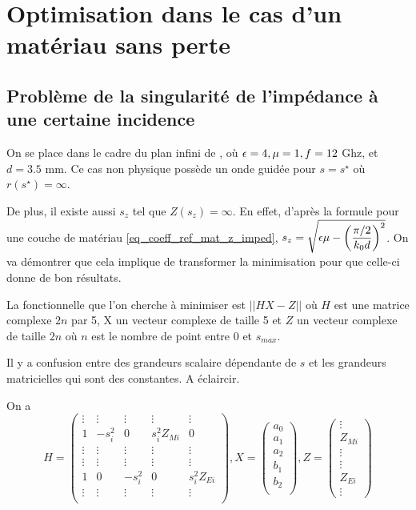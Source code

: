 \section{Optimisation dans le cas d'un matériau sans perte}

\subsection{Problème de la singularité de l'impédance à une certaine incidence}
On se place dans le cadre du plan infini de \cite{soudais_3d_2017}, où $\epsilon=4,\mu=1,f=12$ Ghz, et $d=3.5$ mm. Ce cas non physique possède un onde guidée pour $s=s^\star$ où $r(s^\star) = \infty$. 

De plus, il existe aussi $s_z$ tel que $Z(s_z) = \infty$. En effet, d'après la formule pour une couche de matériau \eqref{eq_coeff_ref_mat_z_imped}, $s_z = \sqrt{\epsilon \mu - \left(\dfrac{\pi/2}{k_0 d}\right)^2}$. On va démontrer que cela implique de transformer la minimisation pour que celle-ci donne de bon résultats.

La fonctionnelle que l'on cherche à minimiser est $||H X - Z||$ où $H$ est une matrice complexe $2n$ par 5, X un vecteur complexe de taille 5 et $Z$ un vecteur complexe de taille $2n$ où $n$ est le nombre de point entre 0 et $s_{max}$. 

{
  \color{red} Il y a confusion entre des grandeurs scalaire dépendante de $s$ et les grandeurs matricielles qui sont des constantes. A éclaircir.
}

On a 
\[
  H = \begin{pmatrix}
  \vdots & \vdots & \vdots & \vdots &\vdots \\
  1 & -s_i^2 & 0 & s_i^2 Z_{Mi} & 0 \\
  \vdots & \vdots & \vdots & \vdots &\vdots \\
  \vdots & \vdots & \vdots & \vdots &\vdots \\
  1 & 0 &-s_i^2 & 0 & s_i^2 Z_{Ei} \\
  \vdots & \vdots & \vdots & \vdots &\vdots \\
  \end{pmatrix},
  X = \begin{pmatrix}
  a_0\\
  a_1\\
  a_2\\
  b_1\\
  b_2\\
  \end{pmatrix},
  Z=\begin{pmatrix}
  \vdots\\
  Z_{Mi}\\
  \vdots\\
  \vdots\\
  Z_{Ei}\\
  \vdots
  \end{pmatrix}
\]

